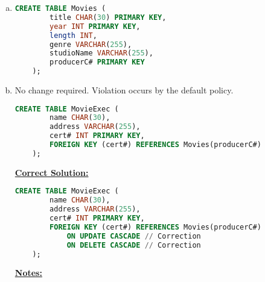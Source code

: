 \documentclass[12pt]{article}
\begin{document}
\begin{enumerate}[1.]
\begin{enumerate}[a)]
        \item

    \begin{lstlisting}[language=SQL]
    CREATE TABLE Movies (
        title CHAR(30) PRIMARY KEY,
        year INT PRIMARY KEY,
        length INT,
        genre VARCHAR(255),
        studioName VARCHAR(255),
        producerC# PRIMARY KEY
    );
    \end{lstlisting}

        \item No change required. Violation occurs by the default policy.

    \begin{lstlisting}[language=SQL]
    CREATE TABLE MovieExec (
        name CHAR(30),
        address VARCHAR(255),
        cert# INT PRIMARY KEY,
        FOREIGN KEY (cert#) REFERENCES Movies(producerC#)
    );
    \end{lstlisting}

        \bigskip

        \begin{mdframed}
            \underline{\textbf{Correct Solution:}}

            \bigskip

    \begin{lstlisting}[language=SQL]
    CREATE TABLE MovieExec (
        name CHAR(30),
        address VARCHAR(255),
        cert# INT PRIMARY KEY,
        FOREIGN KEY (cert#) REFERENCES Movies(producerC#)
            ON UPDATE CASCADE // Correction
            ON DELETE CASCADE // Correction
    );
    \end{lstlisting}

        \end{mdframed}

        \bigskip

        \underline{\textbf{Notes:}}

        \bigskip


\end{enumerate}
\end{enumerate}
\end{document}
